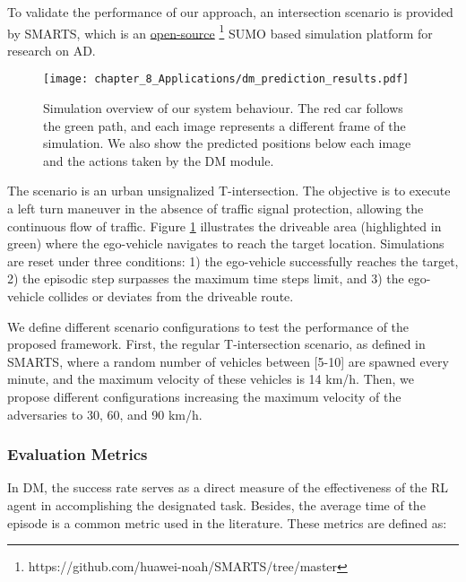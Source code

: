 To validate the performance of our approach, an intersection scenario is provided by \ac{SMARTS}, which is an \href{https://github.com/huawei-noah/SMARTS/tree/master}{open-source} \footnote{https://github.com/huawei-noah/SMARTS/tree/master} \ac{SUMO} \cite{Sumo} based simulation platform for research on \ac{AD}.

\begin{figure}[h]
	\centering        
	\texttt{[image: chapter\_8\_Applications/dm\_prediction\_results.pdf]}
	\captionsetup{justification=justified}
	\caption[Simulation overview of our system behaviour]{Simulation overview of our system behaviour. The red car follows the green path, and each image represents a different frame of the simulation. We also show the predicted positions below each image and the actions taken by the \ac{DM} module.}
	\label{fig:chapter_8_Applications/dm_prediction_results}
\end{figure}

The scenario is an urban unsignalized T-intersection. The objective is to execute a left turn maneuver in the absence of traffic signal protection, allowing the continuous flow of traffic. Figure \ref{fig:chapter_8_Applications/dm_prediction_results} illustrates the driveable area (highlighted in green) where the ego-vehicle navigates to reach the target location. Simulations are reset under three conditions: 1) the ego-vehicle successfully reaches the target, 2) the episodic step surpasses the maximum time steps limit, and 3) the ego-vehicle collides or deviates from the driveable route.

We define different scenario configurations to test the performance of the proposed framework. First, the regular T-intersection scenario, as defined in \ac{SMARTS}, where a random number of vehicles between [5-10] are spawned every minute, and the maximum velocity of these vehicles is 14 km/h. Then, we propose different configurations increasing the maximum velocity of the adversaries to 30, 60, and 90 km/h. 

\subsubsection{Evaluation Metrics}
\label{subsubsec:8_decision_making_experimental_results_evaluation_metrics}

In \ac{DM}, the success rate serves as a direct measure of the effectiveness of the RL agent in accomplishing the designated task. Besides, the average time of the episode is a common metric used in the literature. These metrics are defined as:

